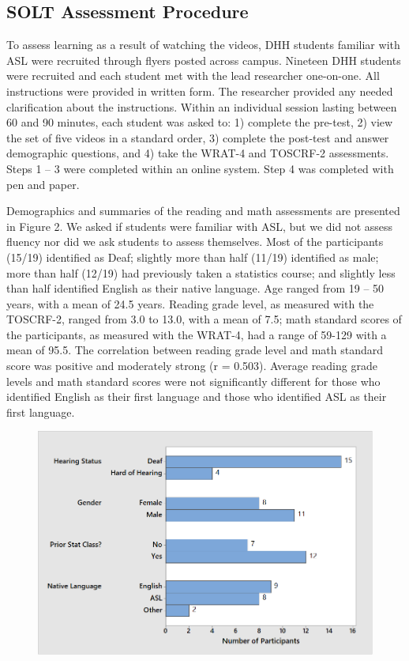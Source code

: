 \documentclass[11.5pt]{sig-alternate} %
\begin{document}
\begin{large}
\subsection*{SOLT Assessment Procedure}

To assess learning as a result of watching the videos, DHH students familiar with ASL were recruited through flyers posted across campus. Nineteen DHH students were recruited and each student met with the lead researcher one-on-one. All instructions were provided in written form. The researcher provided any needed clarification about the instructions. Within an individual session lasting between 60 and 90 minutes, each student was asked to: 1) complete the pre-test, 2) view the set of five videos in a standard order, 3) complete the post-test and answer demographic questions, and 4) take the WRAT-4 and TOSCRF-2 assessments. Steps 1 – 3 were completed within an online system. Step 4 was completed with pen and paper.

Demographics and summaries of the reading and math assessments are presented in Figure 2. We asked if students were familiar with ASL, but we did not assess fluency nor did we ask students to assess themselves. Most of the participants (15/19) identified as Deaf; slightly more than half (11/19) identified as male; more than half (12/19) had previously taken a statistics course; and slightly less than half identified English as their native language. Age ranged from 19 – 50 years, with a mean of 24.5 years. Reading grade level, as measured with the TOSCRF-2, ranged from 3.0 to 13.0, with a mean of 7.5; math standard scores of the participants, as measured with the WRAT-4, had a range of 59-129 with a mean of 95.5. The correlation between reading grade level and math standard score was positive and moderately strong (r = 0.503). Average reading grade levels and math standard scores were not significantly different for those who identified English as their first language and those who identified ASL as their first language.

\begin{figure}[h]
    \centering
    \includegraphics[width=1\linewidth]{Fig_2a.png}
\end{figure}


\end{large}
\end{document}
